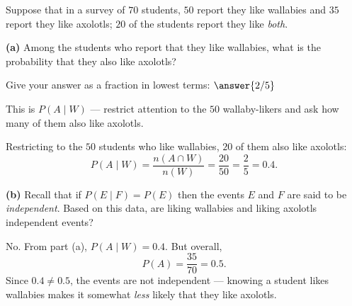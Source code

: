 \documentclass[12pt]{ximera}
\begin{document}
\begin{problem}
Suppose that in a survey of $70$ students, $50$ report they like wallabies and $35$
report they like axolotls; $20$ of the students report they like \emph{both}.

\begin{prompt}
\textbf{(a)} Among the students who report that they like wallabies, what is the
probability that they also like axolotls?

Give your answer as a fraction in lowest terms: $\answer{2/5}$

\begin{hint}
This is $P(A\mid W)$ --- restrict attention to the $50$ wallaby-likers and ask how
many of them also like axolotls.
\end{hint}

\begin{feedback}
Restricting to the $50$ students who like wallabies, $20$ of them also like axolotls:
\[
P(A\mid W)=\frac{n(A\cap W)}{n(W)}=\frac{20}{50}=\frac25=0.4.
\]
\end{feedback}
\end{prompt}

\begin{prompt}
\textbf{(b)} Recall that if $P(E\mid F)=P(E)$ then the events $E$ and $F$ are said to
be \emph{independent}. Based on this data, are liking wallabies and liking axolotls
independent events?

\begin{multipleChoice}
\end{multipleChoice}

\begin{feedback}
No. From part (a), $P(A\mid W)=0.4$. But overall,
\[
P(A)=\frac{35}{70}=0.5.
\]
Since $0.4\neq 0.5$, the events are not independent --- knowing a student likes
wallabies makes it somewhat \emph{less} likely that they like axolotls.
\end{feedback}
\end{prompt}
\end{problem}
\end{document}
